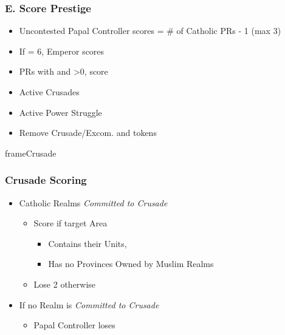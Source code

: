 \documentclass[10pt]{article}
\newlength{\fhCrusade} \setlength\fhCrusade{9\baselineskip}
\begin{document}
\subsubsection*{E. Score Prestige}
\begin{itemize}
	\item Uncontested Papal Controller scores \prestige = \# of Catholic PRs - 1 (max 3)
	\item If \authority = 6, Emperor scores 
	\item PRs with  and \stability>0, score 
	\item Active Crusades
	\item Active Power Struggle
	\item Remove Crusade/Excom. and \battlegroundarea tokens
\end{itemize}
\begin{dynamiccontents*}{frameCrusade}\begin{eubox}{\fhCrusade}
	\subsubsection*{Crusade Scoring }
	\begin{itemize}
		\item Catholic Realms \emph{Committed to Crusade}
		\begin{itemize}
			\item Score  if target Area
			\begin{itemize}
				\item Contains their Units, 
				\item Has no Provinces Owned by Muslim Realms
			\end{itemize}
			\item Lose 2 otherwise
		\end{itemize}
		\item If no Realm is \emph{Committed to Crusade}
		\begin{itemize}
			\item Papal Controller loses 
		\end{itemize}
	\end{itemize}
\end{eubox}\end{dynamiccontents*}
\end{document}
